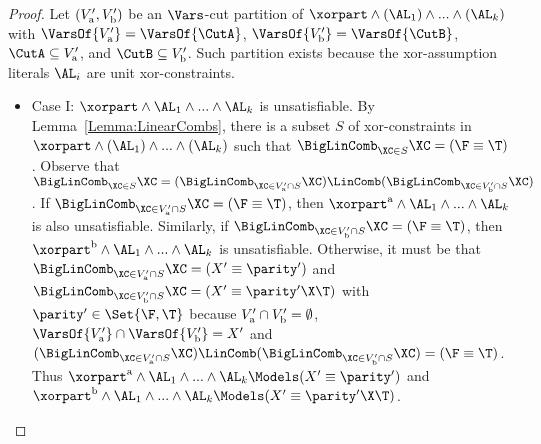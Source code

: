 \begin{proof}
  Let $(V'_\textup{a},V'_\textup{b})$ be an $\Vars$-cut partition of
  $\xorpart \land (\AL_1) \land ... \land (\AL_k)$
  with
  $\VarsOf{\CutAp} = \VarsOf{\CutA}$,
  $\VarsOf{\CutBp} = \VarsOf{\CutB}$,
  $\CutA \subseteq \CutAp$, and
  $\CutB\subseteq \CutBp$.
Such partition exists because the xor-assumption literals $\AL_i$
  are unit xor-constraints.

  \begin{itemize}
\item  Case I: $\xorpart \land {\AL_1 \land ... \land \AL_k}$ is unsatisfiable.
By Lemma~\ref{Lemma:LinearCombs},
  there is a subset $S$ of xor-constraints
  in $\xorpart \land (\AL_1) \land ... \land (\AL_k)$
  such that $\BigLinComb_{\XC \in S} \XC = (\F \equiv \T)$.
Observe that
  $\BigLinComb_{\XC \in S} \XC =
   (\BigLinComb_{\XC \in {\CutAp \cap S}} \XC) \LinComb
   (\BigLinComb_{\XC \in {\CutBp \cap S}} \XC)$.
If $\BigLinComb_{\XC \in {\CutAp \cap S}} \XC = (\F \equiv \T)$,
  then
  $\xorpartA \land {\AL_1 \land ... \land \AL_k}$ is also unsatisfiable.
Similarly,
  if $\BigLinComb_{\XC \in {\CutBp \cap S}} \XC = (\F \equiv \T)$,
  then $\xorpartB \land {\AL_1 \land ... \land \AL_k}$ is unsatisfiable.
Otherwise,
  it must be that
  $\BigLinComb_{\XC \in {\CutAp \cap S}} \XC = (\Iface \equiv \Ifaceparity)$
  and
  $\BigLinComb_{\XC \in {\CutBp \cap S}} \XC = (\Iface \equiv \Ifaceparity \X \T)$
  with $\Ifaceparity \in \Set{\F,\T}$
  because
  $V'_\textup{a} \cap V'_\textup{b} = \emptyset$,
  ${\VarsOf{\CutAp} \cap \VarsOf{\CutBp}} = \Iface$ and
  $(\BigLinComb_{\XC \in {\CutAp \cap S}} \XC) \LinComb
   (\BigLinComb_{\XC \in {\CutBp \cap S}} \XC) = (\F \equiv \T)$.
Thus
  $\xorpartA \land {\AL_1 \land ... \land \AL_k} \Models (\Iface \equiv \Ifaceparity)$ and
  $\xorpartB \land {\AL_1 \land ... \land \AL_k} \Models (\Iface \equiv \Ifaceparity \X \T)$.
  

\end{itemize}
\end{proof}
